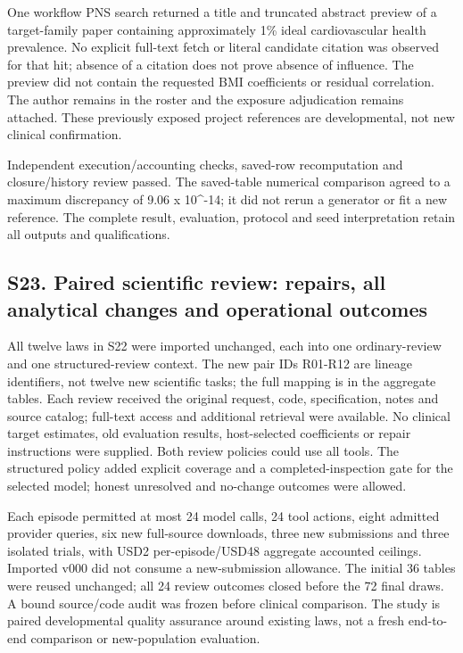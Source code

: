 \documentclass[11pt,letterpaper]{article}
\begin{document}
One workflow PNS search returned a title and truncated abstract preview of a target-family paper containing approximately 1\% ideal cardiovascular health prevalence. No explicit full-text fetch or literal candidate citation was observed for that hit; absence of a citation does not prove absence of influence. The preview did not contain the requested BMI coefficients or residual correlation. The author remains in the roster and the exposure adjudication remains attached. These previously exposed project references are developmental, not new clinical confirmation.


Independent execution/\allowbreak{}accounting checks, saved-row recomputation and closure/\allowbreak{}history review passed. The saved-table numerical comparison agreed to a maximum discrepancy of 9.06 x 10\textasciicircum{}-14; it did not rerun a generator or fit a new reference. The complete result, evaluation, protocol and seed interpretation retain all outputs and qualifications.


\clearpage

\subsection*{S23. Paired scientific review: repairs, all analytical changes and operational outcomes}

All twelve laws in S22 were imported unchanged, each into one ordinary-review and one structured-review context. The new pair IDs R01-R12 are lineage identifiers, not twelve new scientific tasks; the full mapping is in the aggregate tables. Each review received the original request, code, specification, notes and source catalog; full-text access and additional retrieval were available. No clinical target estimates, old evaluation results, host-selected coefficients or repair instructions were supplied. Both review policies could use all tools. The structured policy added explicit coverage and a completed-inspection gate for the selected model; honest unresolved and no-change outcomes were allowed.


Each episode permitted at most 24 model calls, 24 tool actions, eight admitted provider queries, six new full-source downloads, three new submissions and three isolated trials, with USD2 per-episode/\allowbreak{}USD48 aggregate accounted ceilings. Imported v000 did not consume a new-submission allowance. The initial 36 tables were reused unchanged; all 24 review outcomes closed before the 72 final draws. A bound source/\allowbreak{}code audit was frozen before clinical comparison. The study is paired developmental quality assurance around existing laws, not a fresh end-to-end comparison or new-population evaluation.
\end{document}

